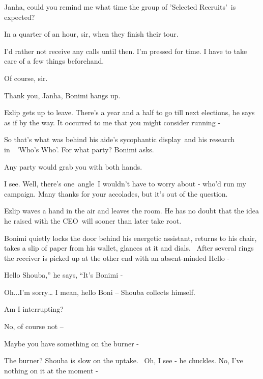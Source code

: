 \documentclass[twoside,11pt]{book}
\begin{document}
{\textquotedbl}Janha, could you remind me what time the group of {}'Selected Recruits{}'{\ }is
expected?{\textquotedbl}

{\textquotedbl}In a quarter of an hour, sir, when they finish their tour.{\textquotedbl} 

{\textquotedbl}I'd rather not receive any calls until then. I'm pressed for time. I have to take care of a few things
beforehand.{\textquotedbl} 

{\textquotedbl}Of course, sir.{\textquotedbl} 

{\textquotedbl}Thank you, Janha,{\textquotedbl} Bonimi hangs up. 

Ezlip gets up to leave. {\textquotedbl}There's a year and a half to go till next elections,{\textquotedbl} he says as if
by the way. {\textquotedbl}It occurred to me that you might consider running -{\textquotedbl}

So that's what was behind his aide's sycophantic display{\ }and his research in\ \ {}'Who's Who{}'.
{\textquotedbl}For what party?{\textquotedbl} Bonimi asks.

{\textquotedbl}Any party would grab you with both hands.{\textquotedbl} 

{\textquotedbl}I see. Well, there's one\ angle\ I wouldn't have to worry about - who'd run my campaign. Many thanks for
your accolades, but it's out of the question.{\textquotedbl}\ 

Ezlip waves a hand in the air and leaves the room. He has no doubt that the idea he raised with the CEO~will sooner than
later take root{.\ }

Bonimi quietly locks the door behind his energetic assistant, returns to his chair, takes a slip of paper from his
wallet, glances at it and dials.~ After several rings the receiver is picked up at the other end with an absent-minded
{\textquotedbl}Hello -{\textquotedbl}\ 

{\textquotedbl}Hello Shouba,'' he says, ``It's Bonimi -{\textquotedbl} 

{\textquotedbl}Oh...I'm sorry{\dots} I mean, hello Boni --{\textquotedbl} Shouba collects himself.

{\textquotedbl}Am I interrupting?{\textquotedbl} 

{\textquotedbl}No, of course not --{\textquotedbl} 

{\textquotedbl}Maybe you have something on the burner -{\textquotedbl} 

{\textquotedbl}The burner?{\textquotedbl} Shouba is slow on the uptake. ~{\textquotedbl}Oh, I see -{\textquotedbl} he
chuckles. {\textquotedbl}No, I've nothing on it at the moment -{\textquotedbl} 
\end{document}
